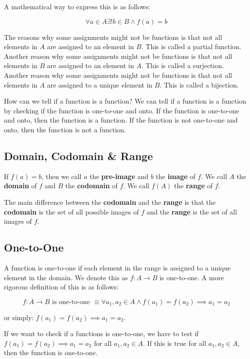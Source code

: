 \documentclass[11pt]{article}
\begin{document}
A mathematical way to express this is as follows:

\[
\forall a \in A \exists ! b \in B \land f(a) = b
\]

The reasons why some assignments might not be functions is that not all elements in \(A\) are assigned to an element in \(B\). This is called a partial function. Another reason why some assignments might not be functions is that not all elements in \(B\) are assigned to an element in \(A\). This is called a surjection. Another reason why some assignments might not be functions is that not all elements in \(A\) are assigned to a unique element in \(B\). This is called a bijection.

How can we tell if a function is a function? We can tell if a function is a function by checking if the function is one-to-one and onto. If the function is one-to-one and onto, then the function is a function. If the function is not one-to-one and onto, then the function is not a function.

\subsection{Domain, Codomain \& Range}
\label{sec:org11ea42a}
If \(f(a) = b\), then we call \(a\) the \textbf{pre-image} and \(b\) the \textbf{image} of \(f\). We call \(A\) the \textbf{domain} of \(f\) and \(B\) the \textbf{codomain} of \(f\). We call \(f(A)\) the \textbf{range} of \(f\).

The main difference between the \textbf{codomain} and the \textbf{range} is that the \textbf{codomain} is the set of all possible images of \(f\) and the \textbf{range} is the set of all images of \(f\).


\subsection{One-to-One}
\label{sec:org6b165bf}
A function is one-to-one if each element in the range is assigned to a unique element in the domain. We denote this as \(f: A \rightarrow B\) is one-to-one. A more rigorous definition of this is as follows:

\[
f: A \rightarrow B \text{ is one-to-one } \equiv \forall a_1, a_2 \in A \land f(a_1) = f(a_2) \implies a_1 = a_2
\]

or simply: \(f(a_1) = f(a_2) \implies a_1 = a_2\).

If we want to check if a functions is one-to-one, we have to test if \(f(a_1) = f(a_2) \implies a_1 = a_2\) for all \(a_1, a_2 \in A\). If this is true for all \(a_1, a_2 \in A\), then the function is one-to-one.
\end{document}
